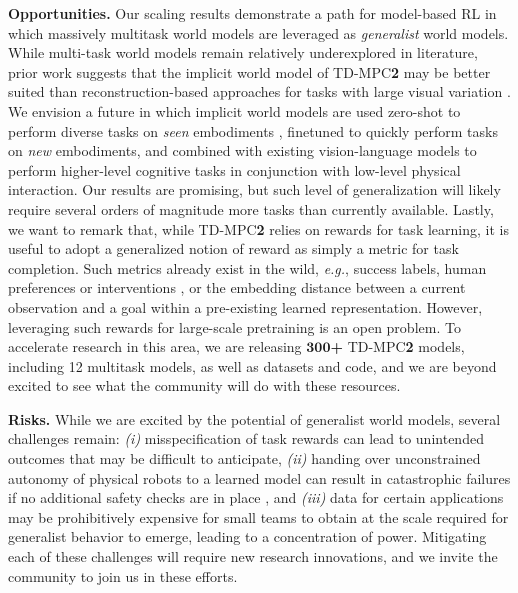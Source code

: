 \documentclass{article}
\begin{document}
\textbf{Opportunities.} Our scaling results demonstrate a path for model-based RL in which massively multitask world models are leveraged as \emph{generalist} world models. While multi-task world models remain relatively underexplored in literature, prior work suggests that the implicit world model of TD-MPC\textbf{2} may be better suited than reconstruction-based approaches for tasks with large visual variation \citep{zhu2023repo}. We envision a future in which implicit world models are used zero-shot to perform diverse tasks on \emph{seen} embodiments \citep{xu2022xtra, yang2023movie}, finetuned to quickly perform tasks on \emph{new} embodiments, and combined with existing vision-language models to perform higher-level cognitive tasks in conjunction with low-level physical interaction. Our results are promising, but such level of generalization will likely require several orders of magnitude more tasks than currently available. Lastly, we want to remark that, while TD-MPC\textbf{2} relies on rewards for task learning, it is useful to adopt a generalized notion of reward as simply a metric for task completion. Such metrics already exist in the wild, \emph{e.g.}, success labels, human preferences or interventions \citep{ouyang2022training}, or the embedding distance between a current observation and a goal \citep{eysenbach2022contrastive, ma2022vip} within a pre-existing learned representation. However, leveraging such rewards for large-scale pretraining is an open problem. To accelerate research in this area, we are releasing $\mathbf{300}$\textbf{+} TD-MPC\textbf{2} models, including 12 multitask models, as well as datasets and code, and we are beyond excited to see what the community will do with these resources.

\textbf{Risks.} While we are excited by the potential of generalist world models, several challenges remain: \emph{(i)} misspecification of task rewards can lead to unintended outcomes \citep{Clark2016Faulty} that may be difficult to anticipate, \emph{(ii)} handing over unconstrained autonomy of physical robots to a learned model can result in catastrophic failures if no additional safety checks are in place \citep{lancaster2023modemv2}, and \emph{(iii)} data for certain applications may be prohibitively expensive for small teams to obtain at the scale required for generalist behavior to emerge, leading to a concentration of power. Mitigating each of these challenges will require new research innovations, and we invite the community to join us in these efforts.
\end{document}
